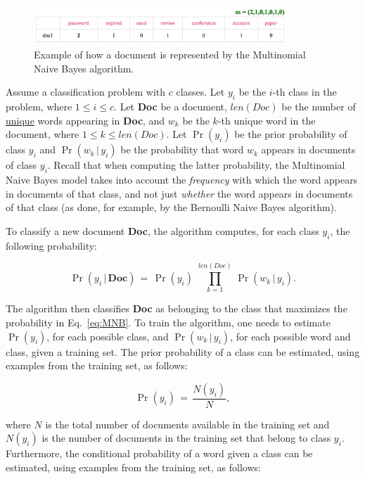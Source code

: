 \documentclass[letterpaper]{article}
\begin{document}
    \begin{figure}[h!!!]
        \centering
        \includegraphics[width=0.85\textwidth]{figures/HW2_multinomial_repr.png}
        \caption{Example of how a document is represented by the Multinomial Naive Bayes algorithm.}
        \label{fig:HW2_multinomial_repr.png}
    \end{figure}

Assume a classification problem with $c$ classes. Let $y_i$ be the $i$-th class in the problem, where $1 \leq i \leq c$. Let \textbf{Doc} be a document, $len(Doc)$ be the number of \underline{unique} words appearing in \textbf{Doc}, and $w_k$ be the $k$-th unique word in the document, where $1 \leq k \leq len(Doc)$. Let $\Pr(y_i)$ be the prior probability of class $y_i$ and $\Pr(w_k \, | \, y_i)$ be the probability that word $w_k$ appears in documents of class $y_i$. Recall that when computing the latter probability, the Multinomial Naive Bayes model takes into account the \textit{frequency} with which the word appears in documents of that class, and not just \textit{whether} the word appears in documents of that class (as done, for example, by the Bernoulli Naive Bayes algorithm).

To classify a new document \textbf{Doc}, the algorithm computes, for each class $y_i$, the following probability:

\begin{equation}
    \Pr(y_i \, | \, \textbf{Doc}) \, = \, \Pr(y_i) \,\, \prod_{k=1}^{len(Doc)} \, \Pr(w_k \, | \, y_i).
    \label{eq:MNB}
\end{equation}

The algorithm then classifies \textbf{Doc} as belonging to the class that maximizes the probability in Eq.~\eqref{eq:MNB}.
%
To train the algorithm, one needs to estimate $\Pr(y_i)$, for each possible class, and $\Pr(w_k \, | \, y_i)$, for each possible word and class, given a training set. The prior probability of a class can be estimated, using examples from the training set, as follows:

\begin{equation}
\Pr(y_i) \, = \,\frac{N(y_i)}{N},
\end{equation}

\noindent where $N$ is the total number of documents available in the training set and $N(y_i)$ is the number of documents in the training set that belong to class $y_i$. Furthermore, the conditional probability of a word given a class can be estimated, using examples from the training set, as follows:
\end{document}
